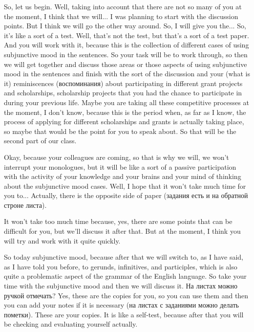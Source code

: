 \documentclass[main.tex]{subfiles}
\begin{document}

So, let us begin.
Well, taking into account that there are not so many of you at the moment, I think that we will...
I was planning to start with the discussion points.
But I think we will go the other way around.
So, I will give you the...
So, it's like a sort of a test.
Well, that's not the test, but that's a sort of a test paper.
And you will work with it, because this is the collection of different cases of using subjunctive mood in the sentences.
So your task will be to work through, so then we will get together and discuss those areas or those aspects of using subjunctive mood in the sentences and finish with the sort of the discussion and your (what is it) reminiscences (воспоминания) about participating in different grant projects and scholarships, scholarship projects that you had the chance to participate in during your previous life.
Maybe you are taking all these competitive processes at the moment, I don't know, because this is the period when, as far as I know, the process of applying for different scholarships and grants is actually taking place, so maybe that would be the point for you to speak about.
So that will be the second part of our class.

Okay, because your colleagues are coming, so that is why we will, we won't interrupt your monologues, but it will be like a sort of a passive participation with the activity of your knowledge and your brains and your mind of thinking about the subjunctive mood cases.
Well, I hope that it won't take much time for you to...
Actually, there is the opposite side of paper (задания есть и на обратной строне листа).

It won't take too much time because, yes, there are some points that can be difficult for you, but we'll discuss it after that.
But at the moment, I think you will try and work with it quite quickly.

So today subjunctive mood, because after that we will switch to, as I have said, as I have told you before, to gerunds, infinitives, and participles, which is also quite a problematic aspect of the grammar of the English language.
So take your time with the subjunctive mood and then we will discuss it.
На листах можно ручкой отмечать?
Yes, these are the copies for you, so you can use them and then you can add your notes if it is necessary (на листах с заданиями можно делать пометки).
These are your copies.
It is like a self-test, because after that you will be checking and evaluating yourself actually.
\end{document}
